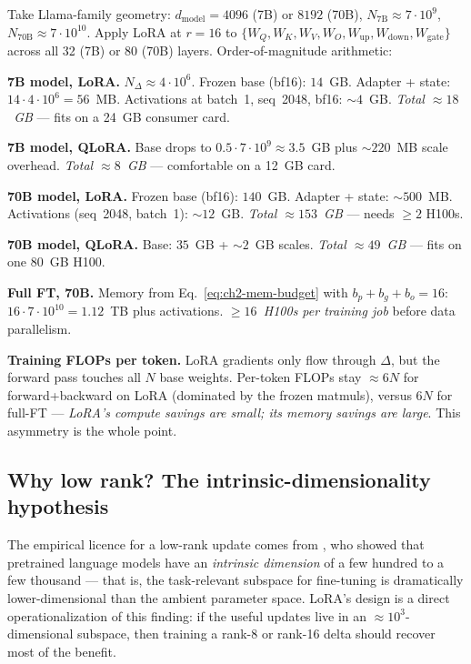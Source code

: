 \begin{workedexample}
Take Llama-family geometry: $d_{\mathrm{model}}=4096$ (7B) or $8192$ (70B),
$N_{\mathrm{7B}} \approx 7 \cdot 10^9$, $N_{\mathrm{70B}} \approx
7 \cdot 10^{10}$. Apply LoRA at $r=16$ to
$\{W_Q,W_K,W_V,W_O,W_{\mathrm{up}},W_{\mathrm{down}},W_{\mathrm{gate}}\}$
across all 32 (7B) or 80 (70B) layers. Order-of-magnitude arithmetic:

\textbf{7B model, LoRA.} $N_{\Delta} \approx 4\cdot 10^6$.
Frozen base (bf16): $14$~GB. Adapter + state: $14 \cdot 4 \cdot 10^6
= 56$~MB. Activations at batch~1, seq~2048, bf16: $\sim 4$~GB.
\emph{Total $\approx 18$~GB} --- fits on a 24~GB consumer card.

\textbf{7B model, QLoRA.} Base drops to $0.5 \cdot 7 \cdot 10^9 \approx
3.5$~GB plus $\sim 220$~MB scale overhead. \emph{Total
$\approx 8$~GB} --- comfortable on a 12~GB card.

\textbf{70B model, LoRA.} Frozen base (bf16): $140$~GB. Adapter +
state: $\sim 500$~MB. Activations (seq~2048, batch~1): $\sim 12$~GB.
\emph{Total $\approx 153$~GB} --- needs $\geq 2$ H100s.

\textbf{70B model, QLoRA.} Base: $35$~GB + $\sim 2$~GB scales.
\emph{Total $\approx 49$~GB} --- fits on one 80~GB H100.

\textbf{Full FT, 70B.} Memory from Eq.~\eqref{eq:ch2-mem-budget}
with $b_p+b_g+b_o=16$: $16 \cdot 7 \cdot 10^{10} = 1.12$~TB plus
activations. \emph{$\geq 16$~H100s per training job} before data
parallelism.

\textbf{Training FLOPs per token.} LoRA gradients only flow through
$\Delta$, but the forward pass touches all $N$ base weights. Per-token
FLOPs stay $\approx 6N$ for forward+backward on LoRA
(dominated by the frozen matmuls), versus $6N$ for full-FT ---
\emph{LoRA's compute savings are small; its memory savings are
large}. This asymmetry is the whole point.
\end{workedexample}

\subsection{\texorpdfstring{Why low rank? The intrinsic-dimensionality hypothesis}{Why low rank? The intrinsic-dimensionality hypothesis}}

The empirical licence for a low-rank update comes from
\citet{aghajanyan2021intrinsic}, who showed that pretrained language
models have an \emph{intrinsic dimension} of a few hundred to a few
thousand --- that is, the task-relevant subspace for fine-tuning is
dramatically lower-dimensional than the ambient parameter space.
LoRA's design is a direct operationalization of this finding: if the
useful updates live in an $\approx 10^3$-dimensional subspace, then
training a rank-8 or rank-16 delta should recover most of the
benefit.

